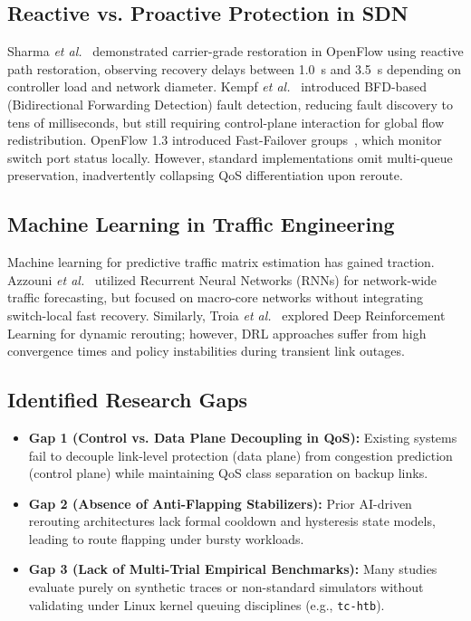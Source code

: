 \documentclass[conference]{IEEEtran}
\begin{document}
\subsection{Reactive vs. Proactive Protection in SDN}
Sharma \textit{et al.}~\cite{sharma2013carrier} demonstrated carrier-grade restoration in OpenFlow using reactive path restoration, observing recovery delays between 1.0~s and 3.5~s depending on controller load and network diameter. Kempf \textit{et al.}~\cite{kempf2012openflow} introduced BFD-based (Bidirectional Forwarding Detection) fault detection, reducing fault discovery to tens of milliseconds, but still requiring control-plane interaction for global flow redistribution. OpenFlow 1.3 introduced Fast-Failover groups~\cite{openflow13}, which monitor switch port status locally. However, standard implementations omit multi-queue preservation, inadvertently collapsing QoS differentiation upon reroute.

\subsection{Machine Learning in Traffic Engineering}
Machine learning for predictive traffic matrix estimation has gained traction. Azzouni \textit{et al.}~\cite{azzouni2018neuromancer} utilized Recurrent Neural Networks (RNNs) for network-wide traffic forecasting, but focused on macro-core networks without integrating switch-local fast recovery. Similarly, Troia \textit{et al.}~\cite{troia2020reinforcement} explored Deep Reinforcement Learning for dynamic rerouting; however, DRL approaches suffer from high convergence times and policy instabilities during transient link outages.

\subsection{Identified Research Gaps}
\begin{itemize}
    \item \textbf{Gap 1 (Control vs. Data Plane Decoupling in QoS):} Existing systems fail to decouple link-level protection (data plane) from congestion prediction (control plane) while maintaining QoS class separation on backup links.
    \item \textbf{Gap 2 (Absence of Anti-Flapping Stabilizers):} Prior AI-driven rerouting architectures lack formal cooldown and hysteresis state models, leading to route flapping under bursty workloads.
    \item \textbf{Gap 3 (Lack of Multi-Trial Empirical Benchmarks):} Many studies evaluate purely on synthetic traces or non-standard simulators without validating under Linux kernel queuing disciplines (e.g., \texttt{tc-htb}).
\end{itemize}
\end{document}
